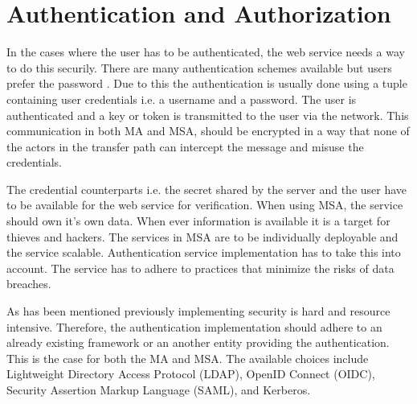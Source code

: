 \section{Authentication and Authorization}
\begin{sloppypar}
    In the cases where the user has to be authenticated, the web service needs 
    a way to do this securily. There are many authentication schemes available 
    but users prefer the password \citep{passwordisdead}. Due to this the 
    authentication is usually done using a tuple containing user credentials 
    i.e. a username and a password. The user is authenticated and a key or 
    token is transmitted to the user via the network. This communication in 
    both MA and MSA, should be encrypted in a way that none of the actors in 
    the transfer path can intercept the message and misuse the credentials. 
\end{sloppypar}
\begin{sloppypar}
    The credential counterparts i.e. the secret shared by the server and the 
    user have to be available for the web service for verification. When using 
    MSA, the service should own it's own data. When ever information is 
    available it is a target for thieves and hackers. The services in MSA are 
    to be individually deployable and the service scalable. Authentication 
    service implementation has to take this into account. The service has to 
    adhere to practices that minimize the risks of data breaches. 
\end{sloppypar}
\begin{sloppypar}
    As has been mentioned previously implementing security is hard and resource 
    intensive. Therefore, the authentication implementation should adhere to an 
    already existing framework or an another entity providing the 
    authentication. This is the case for both the MA and MSA. The available 
    choices include Lightweight Directory Access Protocol (LDAP), OpenID 
    Connect (OIDC), Security Assertion Markup Language (SAML), and Kerberos.
\end{sloppypar}

